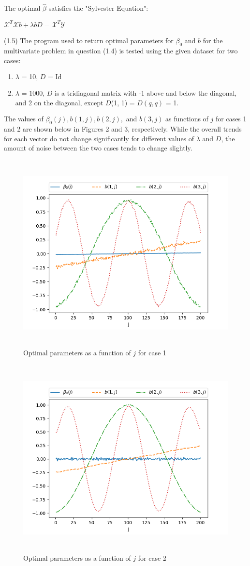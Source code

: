 The optimal $\hat{\beta}$ satisfies the "Sylvester Equation":
\begin{center}
    $\mathcal{X}^{T}\mathcal{X}b + \lambda bD = \mathcal{X}^{T}\mathcal{Y}$
\end{center}
\vspace{5mm}
(1.5) The program used to return optimal parameters for $\beta_{0}$ and $b$ for the multivariate problem in question (1.4) is tested using the given dataset for two cases:
\begin{enumerate}
    \item $\lambda$ = 10, $D$ = Id
    \item $\lambda$ = 1000, $D$ is a tridiagonal matrix with -1 above and below the diagonal, and 2 on the diagonal, except $D$(1, 1) = $D(q, q)$ = 1.
\end{enumerate}
The values of $\beta_{0}(j), b(1, j), b(2, j),$ and $b(3, j)$ as functions of $j$ for cases 1 and 2 are shown below in Figures 2 and 3, respectively. While the overall trends for each vector do not change significantly for different values of $\lambda$ and $D$, the amount of noise between the two cases tends to change slightly.
\begin{figure}[h!]
    \centering
    \includegraphics[height=4in]{Figure_2.png}
    \caption{Optimal parameters as a function of $j$ for case 1}
\end{figure}
\begin{figure}[h!]
    \centering
    \includegraphics[height=4in]{Figure_3.png}
    \caption{Optimal parameters as a function of $j$ for case 2}
\end{figure}